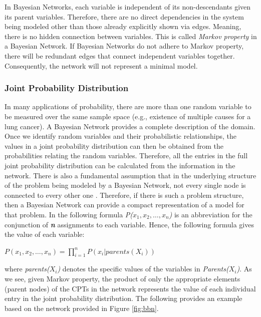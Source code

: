 \documentclass[11pt]{article}
\begin{document}
In Bayesian Networks, each variable is independent of its non-descendants given
its parent variables. Therefore, there are no direct dependencies in the system
being modeled other than those already explicitly shown via edges. Meaning,
there is no hidden connection between variables. This is called \textit{Markov
property} in a Bayesian Network. If Bayesian Networks do not adhere to Markov
property, there will be redundant edges that connect independent variables
together. Consequently, the network will not represent a minimal model.

\subsubsection{Joint Probability Distribution}

In many applications of probability, there are more than one random variable to
be measured over the same sample space (e.g., existence of multiple causes
for a lung cancer). A Bayesian Network provides a complete description of the
domain. Once we identify random variables and their probabilistic relationships,
the values in a joint probability distribution can then be obtained from the
probabilities relating the random variables. Therefore, all the entries in the
full joint probability distribution can be calculated from the information in
the network. There is also a fundamental assumption that in the underlying
structure of the problem being modeled by a Bayesian Network, not every single
node is connected to every other one \cite{korb:bayesian-ai}. Therefore, if
there is such a problem structure, then a Bayesian Network can provide a compact
representation of a model for that problem. In the following formula
\textit{P($x_1, x_2, \ldots, x_n$)} is an abbreviation for the conjunction of
\textit{\textbf{n}} assignments to each variable. Hence, the following formula
gives the value of each variable:

\begin{center}
$P(x_1, x_2, \ldots, x_n) = \prod\limits_{i=1}^{n} P(x_i | parents (X_i))$\\	
\end{center}

\noindent where \textit{parents($X_i$)} denotes the specific values of the
variables in \textit{Parents($X_i$)}. As we see, given Markov property, the
product of only the appropriate elements (parent nodes) of the CPTs in the
network represents the value of each individual entry in the joint probability
distribution. The following provides an example based on the network provided in
Figure \ref{fig:bbn}.\\
\end{document}
